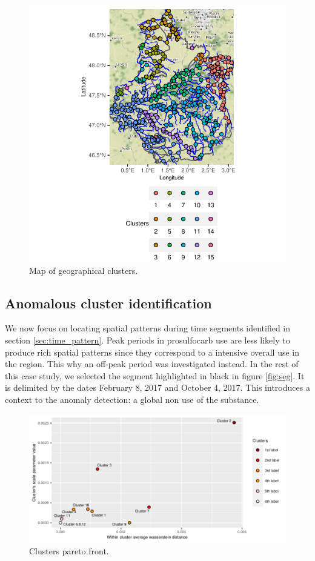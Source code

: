 \begin{figure}[htbp]
  \centering
  \includegraphics[]{figs/Chap5/Graph_clust.pdf}
  \caption{Map of geographical clusters.}
  \label{fig:clust}
\end{figure}

\subsection{Anomalous cluster identification}\label{subsection:anomalous}

We now focus on locating spatial patterns during time segments identified in section \ref{sec:time_pattern}. Peak periods in prosulfocarb use are less likely to produce rich spatial patterns since they correspond to a intensive overall use in the region. This why an off-peak period was investigated instead. In the rest of this case study, we selected the segment highlighted in black in figure \ref{fig:seg}. It is delimited by the dates February 8, 2017 and October 4, 2017. This introduces a context to the anomaly detection: a global non use of the substance. 

\begin{figure}[htbp]
  \centering
  \includegraphics[]{figs/Chap5/Pareto_plot.pdf}
  \caption{Clusters pareto front.}
  \label{fig:pareto:plot}
\end{figure}


